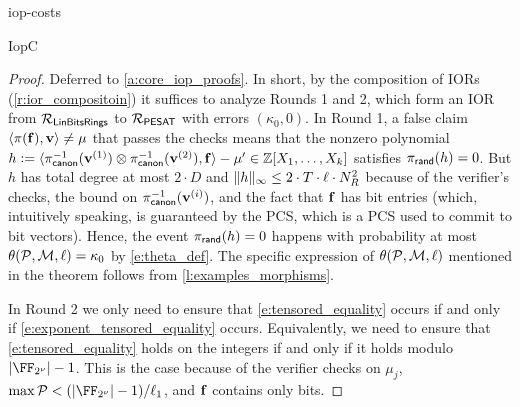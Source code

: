 \begin{lncsappendix}{iop-costs}
\begin{lncsmove}{IopC}
\begin{theorem}
%
%
\end{theorem}
\iflncs
\begin{proof}  Deferred to \cref{a:core_iop_proofs}. In short, by the composition of IORs (\cref{r:ior_compositoin}) it suffices to analyze Rounds 1 and 2, which form an IOR from $\mathcal{R}_{\mathsf{LinBitsRings}}$ to $\mathcal{R}_{\mathsf{PESAT}}$ with errors $(\kappa_0,0)$.  In Round 1, a false claim $\langle\pi(\mathbf{f}),\mathbf{v}\rangle\neq\mu$ that passes the checks means that the nonzero polynomial $h{\;\vcentcolon=\;} \langle \pi_{\mathsf{canon}}^{-1}(\mathbf{v}^{(1)})\otimes\pi_{\mathsf{canon}}^{-1}(\mathbf{v}^{(2)}),\mathbf{f}\rangle-\mu'\in \mathbb{Z}[X_1,\ldots,X_k]$ satisfies $\pi_{\mathsf{rand}}(h)=0$. But $h$ has total degree at most $2\cdot D$ and $\lVert h\rVert_\infty\leq 2\cdot T\cdot\ell\cdot N_R^2$ because of the verifier's checks, the bound on $\pi_{\mathsf{canon}}^{-1}(\mathbf{v}^{(i)})$, and the fact that $\mathbf{f}$ has bit entries (which, intuitively speaking, is guaranteed by the PCS, which is a PCS used to commit to bit vectors). Hence, the event $\pi_{\mathsf{rand}}(h)=0$ happens with probability at most $\theta(\mathcal{P},\mathcal{M},\ell)=\kappa_0$ by \eqref{e:theta_def}. The specific expression of $\theta(\mathcal{P},\mathcal{M},\ell)$ mentioned in the theorem follows from \cref{l:examples_morphisms}. 

    In Round 2 we only need to ensure that \eqref{e:tensored_equality} occurs if and only if \eqref{e:exponent_tensored_equality} occurs. Equivalently, we need to ensure that \eqref{e:tensored_equality} holds on the integers if and only if it holds modulo $|\comfield|-1$. This is the case because of the verifier checks on $\mu_j$,  $\max\cP<\fieldboundsizeexponent$,  and $\mathbf{f}$ contains only bits. %
\end{proof}
\fi
\end{lncsmove}





\end{lncsappendix}
